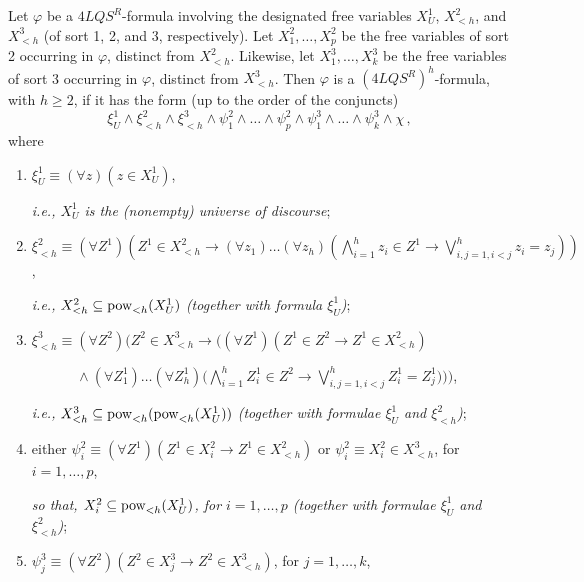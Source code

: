\documentclass{fundam}
\renewcommand{\And}{\wedge}
\newcommand{\pow}{\mbox{\rm pow}}
\newcommand{\QLQSR}{\ensuremath{\mbox{$4\mathit{LQS}^{R}$}}\xspace}
\begin{document}
\begin{definition}[$(\QLQSR)^h$-formulae]\label{def:hlang}
Let $\varphi$ be a $\QLQSR$-formula involving the designated free
variables $X_U^1$, $X_{< h}^2$, and $X_{< h}^3$ (of sort 1, 2, and 3,
respectively).  Let $X_1^2,\ldots,X_p^2$ be the free variables of sort
2 occurring in $\varphi$, distinct from $X_{< h}^2$.  Likewise, let
$X_1^3,\ldots,X_k^3$ be the free variables of sort 3 occurring in
$\varphi$, distinct from $X_{< h}^3$. Then $\varphi$ is a
$(\QLQSR)^h$-formula, with $h \geq 2$, if it has the form (up to the
order of the conjuncts)
\[
\xi_U^1 \And \xi_{< h}^2 \And \xi_{< h}^3 \And \psi_1^2 \And
\ldots \And \psi_p^2 \And \psi_1^3\And \ldots\And \psi_k^3 \And
\chi \, ,
\]
where
\begin{enumerate}
\item $\xi_U^1 \equiv (\forall z)(z \in X_U^1)$,

\emph{i.e., $X_U^1$ is the (nonempty) universe of discourse};

\item $\xi_{< h}^2 \equiv (\forall Z^1)\left(Z^1 \in X_{< h}^2
\rightarrow
      (\forall z_1)\ldots (\forall
      z_{h})\left(\bigwedge_{i=1}^{h} z_i \in Z^1 \rightarrow
      \bigvee_{i,j=1, i<j}^{h} z_i = z_j\right)\right)$,

\emph{i.e., $X_{< h}^2 \subseteq \pow_{< h}(X_U^1)$ (together with
formula $\xi_U^1$)};

\item $\xi_{< h}^3 \equiv (\forall Z^2)\Big(Z^2 \in X_{< h}^3
\rightarrow \Big((\forall Z^1)(Z^1 \in Z^2 \rightarrow Z^1 \in
X_{< h}^2)$

      $\phantom{\xi_{\leq h}^2 =}\And(\forall Z_1^1)\ldots
  (\forall Z_{h}^1)\big(\bigwedge_{i=1}^{h} Z_i^1 \in Z^2 \rightarrow
      \bigvee_{i,j=1, i<j}^{h} Z_i^1 = Z_j^1\big)\Big)\Big)$,

\emph{i.e., $X_{< h}^3 \subseteq \pow_{< h}(\pow_{< h}(X_U^1))$
(together with formulae $\xi_U^1$ and $\xi_{< h}^2$)};

\item either $\psi_i^2 \equiv (\forall Z^1)(Z^1 \in X_i^2 \rightarrow
Z^1 \in X_{< h}^2)$ or $\psi_i^2 \equiv X_i^2 \in X_{< h}^3$, for $i
= 1,\ldots,p$,

\emph{so that, $X_i^2 \subseteq \pow_{< h}(X_U^1)$, for $i = 1,\ldots,p$
(together with formulae $\xi_U^1$ and $\xi_{< h}^2$)};

\item $\psi_j^3 \equiv (\forall Z^2)(Z^2 \in
X_j^3 \rightarrow Z^2 \in X_{< h}^3)$, for $j = 1,\ldots,k$,


\end{enumerate}
\end{definition}
\end{document}
